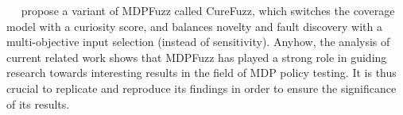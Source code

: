 ~\citeauthor{curefuzz}~\cite{curefuzz} propose a variant of MDPFuzz called CureFuzz, which switches the coverage model with a curiosity score, and balances novelty and fault discovery with a multi-objective input selection (instead of sensitivity).
Anyhow, the analysis of current related work shows that MDPFuzz has played a strong role in guiding research towards interesting results in the field of MDP policy testing. 
It is thus crucial to replicate and reproduce its findings in order to ensure the significance of its results.